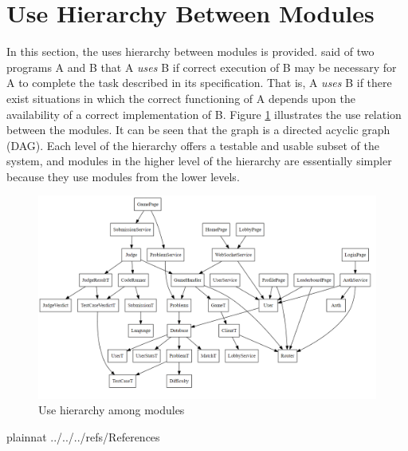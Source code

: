 \documentclass[12pt, titlepage]{article}
\begin{document}
\section{Use Hierarchy Between Modules} \label{SecUse}

In this section, the uses hierarchy between modules is
provided. \citet{Parnas1978} said of two programs A and B that A {\em uses} B if
correct execution of B may be necessary for A to complete the task described in
its specification. That is, A {\em uses} B if there exist situations in which
the correct functioning of A depends upon the availability of a correct
implementation of B.  Figure \ref{FigUH} illustrates the use relation between
the modules. It can be seen that the graph is a directed acyclic graph
(DAG). Each level of the hierarchy offers a testable and usable subset of the
system, and modules in the higher level of the hierarchy are essentially simpler
because they use modules from the lower levels.

\begin{figure}[H]
\centering
\includegraphics[width=1\textwidth]{UseHierarchy.png}

\caption{Use hierarchy among modules}

\label{FigUH}
\end{figure}


 {plainnat}
 {../../../refs/References}

\newpage{}
\end{document}

